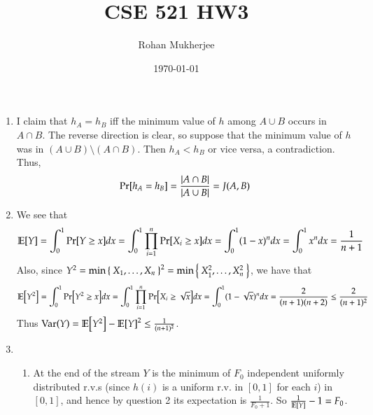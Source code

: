 \documentclass[12pt]{article}
\title{CSE 521 HW3}
\date{\today}
\author{Rohan Mukherjee}
\theoremstyle{definitionstyle}
\renewcommand{\P}{\mathrm{Pr}\qty}
\newcommand{\E}{\mathbb{E}\qty}
\newcommand{\Var}{\mathrm{Var}\qty}
\begin{document}
	\maketitle
	\begin{enumerate}[leftmargin=\labelsep]
		\item I claim that $h_A = h_B$ iff the minimum value of $h$ among $A \cup B$ occurs in $A \cap B$. The reverse direction is clear, so suppose that the minimum value of $h$ was in $(A \cup B) \setminus (A \cap B)$. Then $h_A < h_B$ or vice versa, a contradiction. Thus, 
		\begin{align*}
			\P[h_A = h_B] = \frac{|A \cap B|}{|A \cup B|} = J(A, B)
		\end{align*}
	
		\item We see that
		\begin{align*}
			\E[Y] = \int_0^1 \P[Y \geq x]dx = \int_0^1 \prod_{i=1}^n \P[X_i \geq x]dx = \int_0^1 (1-x)^ndx = \int_0^1 x^ndx = \frac{1}{n+1}
		\end{align*}
		Also, since $Y^2 = \min \Set{X_1, \ldots, X_n}^2 = \min\Set{X_1^2, \ldots, X_n^2}$, we have that 
		\begin{align*}
			\E[Y^2] = \int_0^1 \P[Y^2 \geq x]dx = \int_0^1 \prod_{i=1}^n \P[X_i \geq \sqrt{x}]dx = \int_0^1 (1-\sqrt{x})^n dx = \frac{2}{(n+1)(n+2)} \leq \frac{2}{(n+1)^2}
		\end{align*}
		Thus $\Var(Y) = \E[Y^2] - \E[Y]^2 \leq \frac{1}{(n+1)^2}$.
		
		\item \begin{enumerate}
			\item At the end of the stream $Y$ is the minimum of $F_0$ independent uniformly distributed r.v.s (since $h(i)$ is a uniform r.v. in $[0,1]$ for each $i$) in $[0, 1]$, and hence by question 2 its expectation is $\frac{1}{F_0+1}$. So $\frac{1}{\E[Y]}-1 = F_0$.
			

\end{enumerate}
\end{enumerate}
\end{document}
